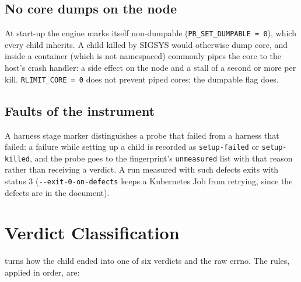 \subsection{No core dumps on the node}
At start-up the engine marks itself non-dumpable (\texttt{PR\_SET\_DUMPABLE = 0}), which every child inherits. A child killed by SIGSYS would otherwise dump core, and inside a container  (which is not namespaced) commonly pipes the core to the host's crash handler: a side effect on the node and a stall of a second or more per kill. \texttt{RLIMIT\_CORE = 0} does not prevent piped cores; the dumpable flag does.

\subsection{Faults of the instrument}
A harness stage marker distinguishes a probe that failed from a harness that failed: a failure while setting up a child is recorded as \texttt{setup-failed} or \texttt{setup-killed}, and the probe goes to the fingerprint's \texttt{unmeasured} list with that reason rather than receiving a verdict. A run measured with such defects exits with status 3 (\texttt{-{}-exit-0-on-defects} keeps a Kubernetes Job from retrying, since the defects are in the document).

\section{Verdict Classification}
\label{sec:verdicts}

 turns how the child ended into one of six verdicts and the raw errno. The rules, applied in order, are:

